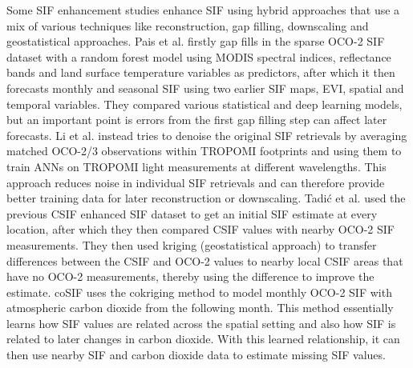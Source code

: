 Some SIF enhancement studies enhance SIF using hybrid approaches that use a mix of various techniques like reconstruction, gap filling, downscaling and geostatistical approaches. Pais et al. \cite{pais2025forecasting} firstly gap fills in the sparse OCO-2 SIF dataset with a random forest model using MODIS spectral indices, reflectance bands and land surface temperature variables as predictors, after which it then forecasts monthly and seasonal SIF using two earlier SIF maps, EVI, spatial and temporal variables. They compared various statistical and deep learning models, but an important point is errors from the first gap filling step can affect later forecasts. Li et al. \cite{li2025more} instead tries to denoise the original SIF retrievals by averaging matched OCO-2/3 observations within TROPOMI footprints and using them to train ANNs on TROPOMI light measurements at different wavelengths. This approach reduces noise in individual SIF retrievals and can therefore provide better training data for later reconstruction or downscaling. Tadić et al. \cite{tadic2024hybrid} used the previous CSIF enhanced SIF dataset to get an initial SIF estimate at every location, after which they then compared CSIF values with nearby OCO-2 SIF measurements. They then used kriging (geostatistical approach) to transfer differences between the CSIF and OCO-2 values to nearby local CSIF areas that have no OCO-2 measurements, thereby using the difference to improve the estimate. coSIF \cite{jacobson2023spatial} uses the cokriging method to model monthly OCO-2 SIF with atmospheric carbon dioxide from the following month. This method essentially learns how SIF values are related across the spatial setting and also how SIF is related to later changes in carbon dioxide. With this learned relationship, it can then use nearby SIF and carbon dioxide data to estimate missing SIF values. 

